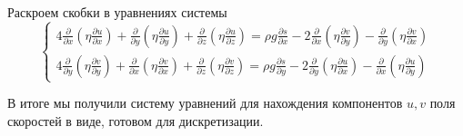 Раскроем скобки в уравнениях системы
\begin{equation*}
    \begin{cases}
        4
        \frac
            {\partial }
            {\partial x}
        \left(
            \eta
            \frac
                {\partial u}
                {\partial x}
        \right)
        +
        \frac
            {\partial }
            {\partial y}
        \left(
            \eta
            \frac
                {\partial u}
                {\partial y}
        \right)
        +
        \frac
            {\partial }
            {\partial z}
        \left(
            \eta
            \frac
                {\partial u}
                {\partial z}
        \right)
        =
        \rho
        g
        \frac
            {\partial s}
            {\partial x}
        -
        2
        \frac
            {\partial }
            {\partial x}
        \left(
            \eta
            \frac
                {\partial v}
                {\partial y}
        \right)                        
        -
        \frac
            {\partial }
            {\partial y}
        \left(
            \eta
            \frac
                {\partial v}
                {\partial x}
        \right)
    \\
        4
        \frac
            {\partial }
            {\partial y}
        \left(
            \eta
            \frac
                {\partial v}
                {\partial y}
        \right)
        +
        \frac
            {\partial }
            {\partial x}
        \left(
            \eta
            \frac
                {\partial v}
                {\partial x}
        \right)
        +
        \frac
            {\partial }
            {\partial z}
        \left(
            \eta
            \frac
                {\partial v}
                {\partial z}
        \right)
        =
        \rho
        g
        \frac
            {\partial s}
            {\partial y}
        -
        2
        \frac
            {\partial }
            {\partial y}
        \left(
            \eta
            \frac
                {\partial u}
                {\partial x}
        \right)                        
        -
        \frac
            {\partial }
            {\partial x}
        \left(
            \eta
            \frac
                {\partial u}
                {\partial y}
        \right)        
    \end{cases}
\end{equation*}

В итоге мы получили систему уравнений для нахождения
компонентов $u,v$ поля скоростей в виде, готовом для 
дискретизации.

